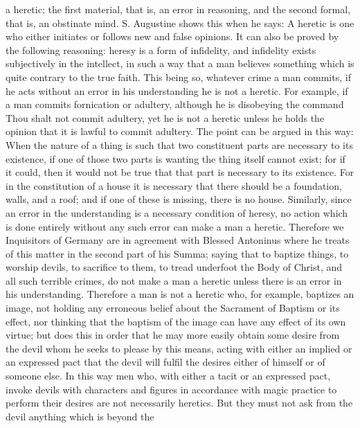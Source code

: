        a heretic; the first material, that is, an error in reasoning, and the second formal, that is, an
       obstinate mind. S. Augustine shows this when he says: A heretic is one who either initiates
       or follows new and false opinions. It can also be proved by the following reasoning: heresy
       is a form of infidelity, and infidelity exists subjectively in the intellect, in such a way that a
       man believes something which is quite contrary to the true faith.
             This being so, whatever crime a man commits, if he acts without an error in his
       understanding he is not a heretic. For example, if a man commits fornication or adultery,
       although he is disobeying the command Thou shalt not commit adultery, yet he is not a
       heretic unless he holds the opinion that it is lawful to commit adultery. The point can be
       argued in this way: When the nature of a thing is such that two constituent parts are
       necessary to its existence, if one of those two parts is wanting the thing itself cannot exist;
       for if it could, then it would not be true that that part is necessary to its existence. For in the
       constitution of a house it is necessary that there should be a foundation, walls, and a roof;
       and if one of these is missing, there is no house. Similarly, since an error in the
       understanding is a necessary condition of heresy, no action which is done entirely without
       any such error can make a man a heretic.
             Therefore we Inquisitors of Germany are in agreement with Blessed Antoninus where
       he treats of this matter in the second part of his Summa; saying that to baptize things, to
       worship devils, to sacrifice to them, to tread underfoot the Body of Christ, and all such
       terrible crimes, do not make a man a heretic unless there is an error in his understanding.
       Therefore a man is not a heretic who, for example, baptizes an image, not holding any
       erroneous belief about the Sacrament of Baptism or its effect, nor thinking that the baptism
       of the image can have any effect of its own virtue; but does this in order that he may more
       easily obtain some desire from the devil whom he seeks to please by this means, acting with
       either an implied or an expressed pact that the devil will fulfil the desires either of himself or
       of someone else. In this way men who, with either a tacit or an expressed pact, invoke devils
       with characters and figures in accordance with magic practice to perform their desires are
       not necessarily heretics. But they must not ask from the devil anything which is beyond the
